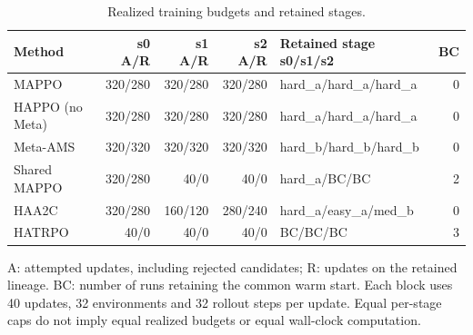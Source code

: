 \begin{table}[t]
\centering
\caption{Realized training budgets and retained stages.}
\label{tab:budget}
\small
\setlength{\tabcolsep}{4pt}
\begin{tabular}{lrrrlr}
\toprule
Method & s0 A/R & s1 A/R & s2 A/R & Retained stage s0/s1/s2 & BC \\
\midrule
MAPPO & 320/280 & 320/280 & 320/280 & hard\_a/hard\_a/hard\_a & 0 \\
HAPPO (no Meta) & 320/280 & 320/280 & 320/280 & hard\_a/hard\_a/hard\_a & 0 \\
Meta-AMS & 320/320 & 320/320 & 320/320 & hard\_b/hard\_b/hard\_b & 0 \\
Shared MAPPO & 320/280 & 40/0 & 40/0 & hard\_a/BC/BC & 2 \\
HAA2C & 320/280 & 160/120 & 280/240 & hard\_a/easy\_a/med\_b & 0 \\
HATRPO & 40/0 & 40/0 & 40/0 & BC/BC/BC & 3 \\
\bottomrule
\end{tabular}

\vspace{2pt}\begin{minipage}{\linewidth}\footnotesize A: attempted updates, including rejected candidates; R: updates on the retained lineage. BC: number of runs retaining the common warm start. Each block uses 40 updates, 32 environments and 32 rollout steps per update. Equal per-stage caps do not imply equal realized budgets or equal wall-clock computation.\end{minipage}
\end{table}
